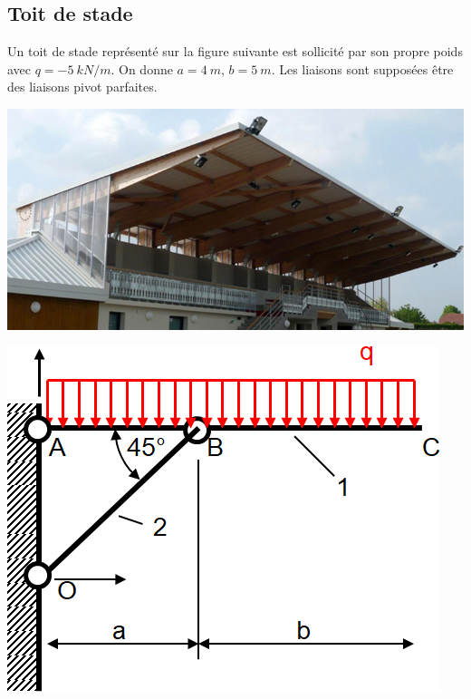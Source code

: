 \documentclass[10pt,fleqn]{article} %
\begin{document}

\vspace{4cm}
\pagestyle{fancy}
\thispagestyle{plain}


\def\columnseprulecolor{\color{ocre}}
\setlength{\columnseprule}{0.4pt} 

\ifprof
\else
\begin{multicols}{2}
\fi
\section*{Toit de stade}
Un toit de stade représenté sur la figure suivante est sollicité par son propre poids  avec $q=\SI{-5}{kN/m}$.  On donne $a=\SI{4}{m}$, $b=\SI{5}{m}$. Les liaisons sont supposées être des liaisons pivot parfaites.
\begin{center}
\includegraphics[width=.9\linewidth]{images/fig_01}
\end{center}

\begin{center}
\includegraphics[width=.9\linewidth]{images/fig_02}
\end{center}


\end{multicols}
\end{document}
